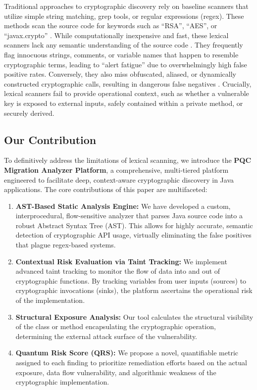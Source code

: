 \documentclass[conference]{IEEEtran}
\begin{document}
Traditional approaches to cryptographic discovery rely on baseline scanners that utilize simple string matching, grep tools, or regular expressions (regex). These methods scan the source code for keywords such as ``RSA'', ``AES'', or ``javax.crypto'' \cite{egele2012}. While computationally inexpensive and fast, these lexical scanners lack any semantic understanding of the source code \cite{wagner2000}. They frequently flag innocuous strings, comments, or variable names that happen to resemble cryptographic terms, leading to ``alert fatigue'' due to overwhelmingly high false positive rates. Conversely, they also miss obfuscated, aliased, or dynamically constructed cryptographic calls, resulting in dangerous false negatives \cite{nadi2016}. Crucially, lexical scanners fail to provide operational context, such as whether a vulnerable key is exposed to external inputs, safely contained within a private method, or securely derived.

\subsection{Our Contribution}
To definitively address the limitations of lexical scanning, we introduce the \textbf{PQC Migration Analyzer Platform}, a comprehensive, multi-tiered platform engineered to facilitate deep, context-aware cryptographic discovery in Java applications. The core contributions of this paper are multifaceted:

\begin{enumerate}
    \item \textbf{AST-Based Static Analysis Engine:} We have developed a custom, interprocedural, flow-sensitive analyzer that parses Java source code into a robust Abstract Syntax Tree (AST). This allows for highly accurate, semantic detection of cryptographic API usage, virtually eliminating the false positives that plague regex-based systems.
    \item \textbf{Contextual Risk Evaluation via Taint Tracking:} We implement advanced taint tracking to monitor the flow of data into and out of cryptographic functions. By tracking variables from user inputs (sources) to cryptographic invocations (sinks), the platform ascertains the operational risk of the implementation.
    \item \textbf{Structural Exposure Analysis:} Our tool calculates the structural visibility of the class or method encapsulating the cryptographic operation, determining the external attack surface of the vulnerability.
    \item \textbf{Quantum Risk Score (QRS):} We propose a novel, quantifiable metric assigned to each finding to prioritize remediation efforts based on the actual exposure, data flow vulnerability, and algorithmic weakness of the cryptographic implementation.
\end{enumerate}
\end{document}
